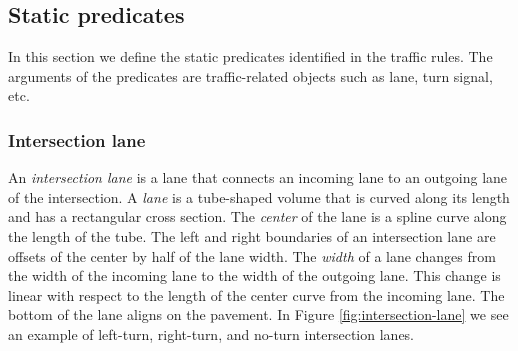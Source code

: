 \subsection{Static predicates}
In this section we define
the static predicates identified in the traffic rules.
The arguments of the predicates are traffic-related objects
such as lane, turn signal, etc.

\subsubsection{Intersection lane}
An \emph{intersection lane} is a lane
that connects an incoming lane to an outgoing lane
of the intersection.
A \emph{lane} is a tube-shaped volume
that is curved along its length
and has a rectangular cross section.
The \emph{center} of the lane is a spline curve
along the length of the tube.
The left and right boundaries of an intersection lane
are offsets of the center by half of the lane width.
The \emph{width} of a lane changes
from the width of the incoming lane to the width of the outgoing lane.
This change is linear
with respect to the length of the center curve from the incoming lane.
The bottom of the lane aligns on the pavement.
In Figure \ref{fig:intersection-lane}
we see an example of left-turn,
right-turn,
and no-turn intersection lanes.

